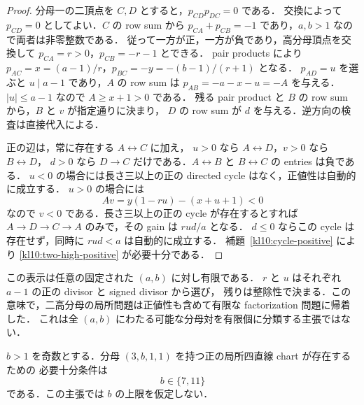 \begin{proof}
分母一の二頂点を $C,D$ とすると，$p_{CD}p_{DC}=0$ である．
交換によって $p_{CD}=0$ としてよい．$C$ の row sum から
$p_{CA}+p_{CB}=-1$ であり，$a,b>1$ なので両者は非零整数である．
従って一方が正，一方が負であり，高分母頂点を交換して
$p_{CA}=r>0$，$p_{CB}=-r-1$ とできる．
pair products により $p_{AC}=x=(a-1)/r$，$p_{BC}=-y=-(b-1)/(r+1)$ となる．
$p_{AD}=u$ を選ぶと $u\mid a-1$ であり，$A$ の row sum は $p_{AB}=-a-x-u=-A$ を与える．
$|u|\leq a-1$ なので $A\geq x+1>0$ である．
残る pair product と $B$ の row sum から，$B$ と $v$ が指定通りに決まり，
$D$ の row sum が $d$ を与える．逆方向の検査は直接代入による．

正の辺は，常に存在する $A\leftrightarrow C$ に加え，
$u>0$ なら $A\leftrightarrow D$，$v>0$ なら $B\leftrightarrow D$，
$d>0$ なら $D\to C$ だけである．$A\leftrightarrow B$ と $B\leftrightarrow C$ の entries は負である．
$u<0$ の場合には長さ三以上の正の directed cycle はなく，正値性は自動的に成立する．
$u>0$ の場合には
\[
 A v=y(1-ru)-(x+u+1)<0
\]
なので $v<0$ である．長さ三以上の正の cycle が存在するとすれば
$A\to D\to C\to A$ のみで，その gain は $rud/a$ となる．
$d\leq0$ ならこの cycle は存在せず，同時に $rud<a$ は自動的に成立する．
補題~\ref{kl10:cycle-positive} により \eqref{kl10:two-high-positive} が必要十分である．
\end{proof}

この表示は任意の固定された $(a,b)$ に対し有限である．
$r$ と $u$ はそれぞれ $a-1$ の正の divisor と signed divisor から選び，
残りは整除性で決まる．この意味で，二高分母の局所問題は正値性も含めて有限な factorization 問題に帰着した．
これは全 $(a,b)$ にわたる可能な分母対を有限個に分類する主張ではない．

\begin{corollary}[分母三を含む二高分母の分類]\label{kl10:three-pair-classification}
$b>1$ を奇数とする．分母 $(3,b,1,1)$ を持つ正の局所四直線 chart が存在するための
必要十分条件は
\[
 b\in\{7,11\}
\]
である．この主張では $b$ の上限を仮定しない．
\end{corollary}

